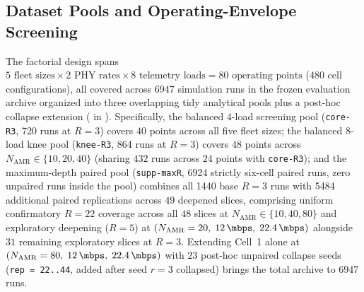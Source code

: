 \documentclass[11pt,a4paper]{article}
\newcommand{\Namr}{\ensuremath{N_{\mathrm{AMR}}}}
\begin{document}
\subsection{Dataset Pools and Operating-Envelope Screening}
\label{sec:pools_stats}

The factorial design spans $5\text{ fleet sizes} \times 2\text{ PHY rates} \times 8\text{ telemetry loads} = 80\text{ operating points}$ ($480$ cell configurations), all covered across \num{6947} simulation runs in the frozen evaluation archive organized into three overlapping tidy analytical pools plus a post-hoc collapse extension ( in ). Specifically, the balanced 4-load screening pool (\texttt{core-R3}, \num{720} runs at $R=3$) covers $40$ points across all five fleet sizes; the balanced 8-load knee pool (\texttt{knee-R3}, \num{864} runs at $R=3$) covers $48$ points across $\Namr \in \{10, 20, 40\}$ (sharing $432$ runs across $24$ points with \texttt{core-R3}); and the maximum-depth paired pool (\texttt{supp-maxR}, \num{6924} strictly six-cell paired runs, zero unpaired runs inside the pool) combines all \num{1440} base $R=3$ runs with \num{5484} additional paired replications across $49$ deepened slices, comprising uniform confirmatory $R=22$ coverage across all $48$ slices at $\Namr \in \{10, 40, 80\}$ and exploratory deepening ($R=5$) at $(\Namr=20,\; \qty{12}{\mbps},\; \qty{22.4}{\mbps})$ alongside $31$ remaining exploratory slices at $R=3$. Extending Cell~1 alone at $(\Namr=80,\; \qty{12}{\mbps},\; \qty{22.4}{\mbps})$ with $23$ post-hoc unpaired collapse seeds (\texttt{rep = 22..44}, added after seed $r=3$ collapsed) brings the total archive to \num{6947} runs.
\end{document}

